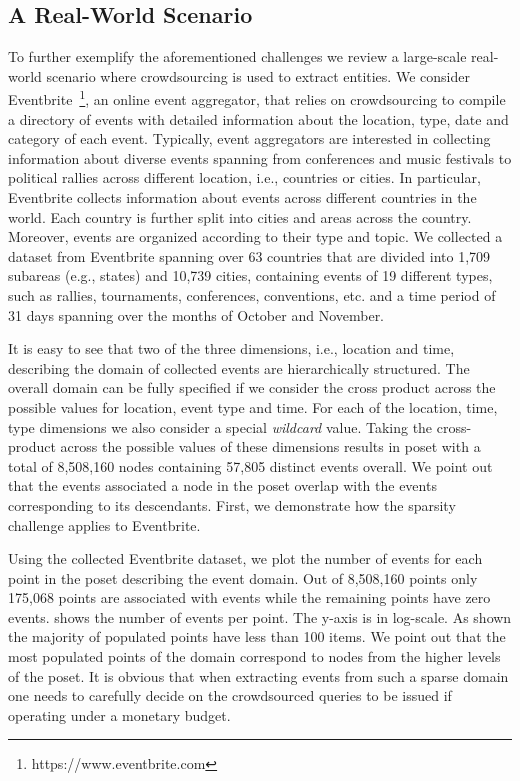 \subsection{A Real-World Scenario}
\label{sec:challenges}
To further exemplify the aforementioned challenges we review a large-scale real-world scenario where crowdsourcing is used to extract entities. 
We consider Eventbrite~\footnote{https://www.eventbrite.com}, an online event aggregator, that relies on crowdsourcing to compile a directory of events with detailed information about the location, type, date and category of each event. Typically, event aggregators are interested in collecting information about diverse events spanning from conferences and music festivals to political rallies across different location, i.e., countries or cities. In particular, Eventbrite collects information about events across different countries in the world. Each country is further split into cities and areas across the country. Moreover, events are organized according to their type and topic. We collected a dataset from Eventbrite spanning over 63 countries that are divided into 1,709 subareas (e.g., states) and 10,739 cities, containing events of 19 different types, such as rallies, tournaments, conferences, conventions, etc. and a time period of 31 days spanning over the months of October and November. 

It is easy to see that two of the three dimensions, i.e., location and time, describing the domain of collected events  are hierarchically structured. The overall domain can be fully specified if we consider the cross product across the possible values for location, event type and time. For each of the location, time, type dimensions we also consider a special {\em wildcard} value. Taking the cross-product across the possible values of these dimensions results in poset with a total of 8,508,160 nodes containing 57,805 distinct events overall. We point out that the events associated a node in the poset overlap with the events corresponding to its descendants. First, we demonstrate how the sparsity challenge applies to Eventbrite.
\begin{example}
Using the collected Eventbrite dataset, we plot the number of events for each point in the poset describing the event domain. Out of 8,508,160 points only 175,068 points are associated with events while the remaining points have zero events.  shows the number of events per point. The y-axis is in log-scale. As shown the majority of populated points have less than 100 items. We point out that the most populated points of the domain correspond to nodes from the higher levels of the poset. It is obvious that when extracting events from such a sparse domain one needs to carefully decide on the crowdsourced queries to be issued if operating under a monetary budget.
\end{example}

